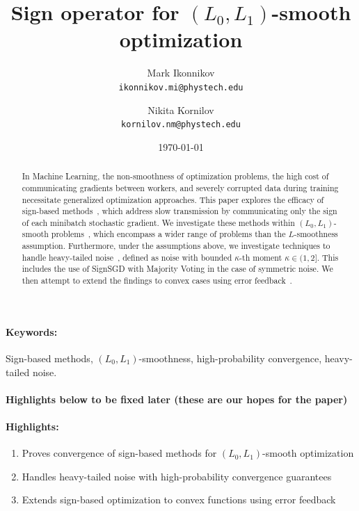 \documentclass[12pt]{article}
\title{Sign operator for $(L_0, L_1)$-smooth optimization}
\author{
  Mark Ikonnikov\\
  \texttt{ikonnikov.mi@phystech.edu}
  \and
  Nikita Kornilov\\
  \texttt{kornilov.nm@phystech.edu}
}
\date{\today}
\begin{document}
\maketitle


\begin{abstract}
In Machine Learning, the non-smoothness of optimization problems, the high cost of communicating gradients between workers, and severely corrupted data during training necessitate generalized optimization approaches. This paper explores the efficacy of sign-based methods~\cite{pmlr-v80-bernstein18a}, which address slow transmission by communicating only the sign of each minibatch stochastic gradient. We investigate these methods within $(L_0, L_1)$-smooth problems~\cite{gorbunov}, which encompass a wider range of problems than the $L$-smoothness assumption. Furthermore, under the assumptions above, we investigate techniques to handle heavy-tailed noise~\cite{Kornilov2025}, defined as noise with bounded $\kappa$-th moment $\kappa \in (1,2]$. This includes the use of SignSGD with Majority Voting in the case of symmetric noise. We then attempt to extend the findings to convex cases using error feedback~\cite{karimireddy}.
\end{abstract}

\paragraph{Keywords:} Sign-based methods, $(L_0, L_1)$-smoothness, high-probability convergence, heavy-tailed noise.

\paragraph{ Highlights below to be fixed later (these are our hopes for the paper)}

\paragraph{ Highlights:}
\begin{enumerate}
\item Proves convergence of sign-based methods for $(L_0, L_1)$-smooth optimization
\item Handles heavy-tailed noise with high-probability convergence guarantees
\item Extends sign-based optimization to convex functions using error feedback
\end{enumerate}
\end{document}
